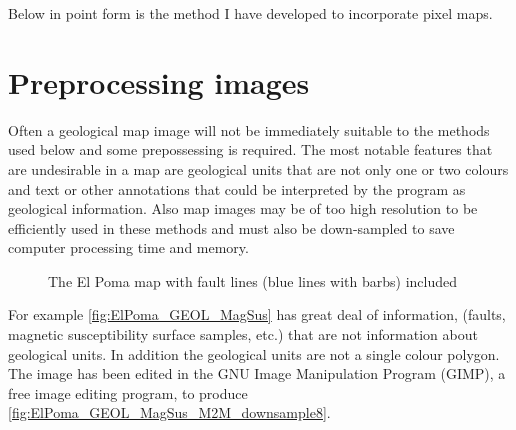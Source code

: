 Below in point form is the method I have developed to incorporate pixel maps.

\section{ Preprocessing images}
\label{sec: Preprocessing images}

Often a geological map image will not be immediately suitable to the methods used below and some prepossessing is required. The most notable features that are undesirable in a map are geological units that are not only one or two colours and text or other annotations that could be interpreted by the program as geological information. Also map images may be of too high resolution to be efficiently used in these methods and must also be down-sampled to save  computer processing time and memory.

 \begin{figure} [h]
    \centering
    \caption{The El Poma map with fault lines (blue lines with barbs) included}
    \label{fig:ElPoma_GEOL_MagSus}
\end{figure}

For example \autoref{fig:ElPoma_GEOL_MagSus} has great deal of information, (faults, magnetic susceptibility surface samples, etc.) that are not information about geological units. In addition the geological units are not a single colour polygon. The image has been edited in the GNU Image Manipulation Program (GIMP), a free image editing program, to produce \autoref{fig:ElPoma_GEOL_MagSus_M2M_downsample8}. 

